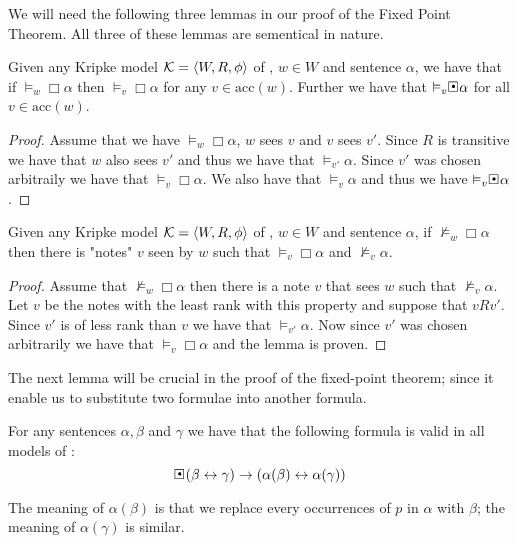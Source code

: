 \documentclass[../main.tex]{subfiles}
\begin{document}
We will need the following three lemmas in our proof of the Fixed Point
Theorem.
All three of these lemmas are sementical in nature. 
\begin{lem}
	\label{lem:acc}
	Given any Kripke model $\mathcal{K}=\langle W,R,\phi\rangle$ of \GL, $w\in W$ and
	sentence $\alpha$, we have that if $\vDash_w\Box\alpha$ then
	$\vDash_v\Box\alpha$ for any $v\in\text{acc}(w)$. Further we have that
	$\vDash_v\sBox\alpha$ for all $v\in\text{acc}(w)$.
\end{lem}
\begin{proof}
	Assume that we have $\vDash_w\Box\alpha$, $w$ sees  $v$ and
	$v$ sees $v'$. Since $R$ is transitive we have that $w$ also sees $v'$ and thus we have that $\vDash_{v'}\alpha$. Since
	$v'$ was chosen arbitraily we have that $\vDash_v\Box\alpha$. We also
	have that $\vDash_v\alpha$ and thus we have $\vDash_v\sBox\alpha$.
\end{proof}
\begin{lem}
	\label{lem:con}
	Given any Kripke model $\mathcal{K}=\langle W,R,\phi\rangle$ of \GL, $w\in W$ and
	sentence $\alpha$, if $\not\vDash_w\Box\alpha$ then there is "notes"
	$v$ seen by  $w$ such that $\vDash_v\Box\alpha$ and
	$\not\vDash_v\alpha$.
\end{lem}
\begin{proof}
	Assume that $\not\vDash_w\Box\alpha$ then there is a note $v$
	that sees  $w$ such that $\not\vDash_v\alpha$. Let $v$ be the notes
	with the least rank with this property and suppose that $vRv'$. Since
	$v'$ is of less rank than $v$ we have that $\vDash_{v'}\alpha$. Now
	since $v'$ was chosen arbitrarily we have that $\vDash_v\Box\alpha$ and
	the lemma is proven.
\end{proof}
The next lemma will be crucial in the proof of the fixed-point theorem; since
it enable us to substitute two formulae into another formula.
\begin{lem}
	\label{lem:sem}
	For any sentences $\alpha,\beta$ and $\gamma$ we have that the
	following formula is valid in all models of \GL:
	$$\sBox(\beta\leftrightarrow\gamma)\rightarrow(\alpha(\beta)\leftrightarrow\alpha(\gamma))$$
\end{lem}
The meaning of $\alpha(\beta)$ is that we replace every occurrences of $p$ in
$\alpha$ with $\beta$; the meaning of $\alpha(\gamma)$ is similar.
\end{document}
